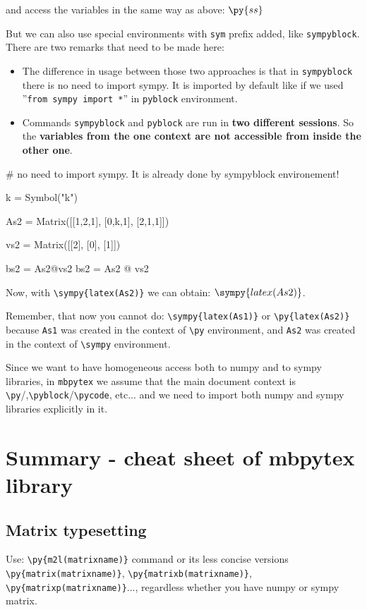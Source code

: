 \documentclass[11pt]{article}
\begin{document}
and access the variables in the same way as above: $\py{ss}$

But we can also use special environments with \verb|sym| prefix added, like \verb|sympyblock|. There are two remarks that need to be made here:
\begin{itemize}
\item The difference in usage between those two approaches is that in \verb|sympyblock| there is no need to import sympy. It is imported by default like if we used ''\verb|from sympy import *|'' in \verb|pyblock| environment.

\item Commands \verb|sympyblock| and \verb|pyblock| are run in {\bf two different sessions}. So the {\bf variables from the one context are not accessible from inside the other one}.
\end{itemize}


\begin{sympyblock}
# no need to import sympy. It is already done by sympyblock environement!

k = Symbol("k")

As2 = Matrix([[1,2,1],
              [0,k,1],
              [2,1,1]])
              
vs2 = Matrix([[2],
              [0],
              [1]])

bs2 = As2@vs2
bs2 = As2 @ vs2
\end{sympyblock}

Now, with \verb|\sympy{latex(As2)}| we can obtain:
$\sympy{latex(As2)}$.

Remember, that now you cannot do:
\verb|\sympy{latex(As1)}| or \verb|\py{latex(As2)}| because \verb|As1| was created in the context of \verb|\py| environment, and \verb|As2| was created in the context of \verb|\sympy| environment. 

Since we want to have homogeneous access both to numpy and to sympy libraries, in \verb|mbpytex| we assume that the main document context is \verb|\py|/,\verb|\pyblock|/\verb|\pycode|, etc... and we need to import both numpy and sympy libraries explicitly in it.

\section{Summary - cheat sheet of mbpytex library}

\subsection{Matrix typesetting}
Use: \verb|\py{m2l(matrixname)}| command or its less concise versions \verb|\py{matrix(matrixname)}|, \verb|\py{matrixb(matrixname)}|, \verb|\py{matrixp(matrixname)}|..., regardless whether you have numpy or sympy matrix.
\end{document}

